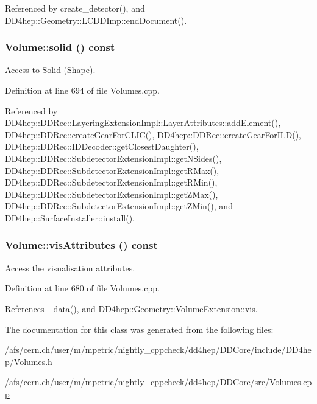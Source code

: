 Referenced by create\_\-detector(), and DD4hep::Geometry::LCDDImp::endDocument().\hypertarget{class_d_d4hep_1_1_geometry_1_1_volume_a35ba3ff621375ca5fb8e5c9474e4e179}{
\subsubsection[{solid}]{ Volume::solid () const}}
\label{class_d_d4hep_1_1_geometry_1_1_volume_a35ba3ff621375ca5fb8e5c9474e4e179}


Access to Solid (Shape). 

Definition at line 694 of file Volumes.cpp.

Referenced by DD4hep::DDRec::LayeringExtensionImpl::LayerAttributes::addElement(), DD4hep::DDRec::createGearForCLIC(), DD4hep::DDRec::createGearForILD(), DD4hep::DDRec::IDDecoder::getClosestDaughter(), DD4hep::DDRec::SubdetectorExtensionImpl::getNSides(), DD4hep::DDRec::SubdetectorExtensionImpl::getRMax(), DD4hep::DDRec::SubdetectorExtensionImpl::getRMin(), DD4hep::DDRec::SubdetectorExtensionImpl::getZMax(), DD4hep::DDRec::SubdetectorExtensionImpl::getZMin(), and DD4hep::SurfaceInstaller::install().\hypertarget{class_d_d4hep_1_1_geometry_1_1_volume_a53c50a053aebaff28bb27a36c824db50}{
\subsubsection[{visAttributes}]{ Volume::visAttributes () const}}
\label{class_d_d4hep_1_1_geometry_1_1_volume_a53c50a053aebaff28bb27a36c824db50}


Access the visualisation attributes. 

Definition at line 680 of file Volumes.cpp.

References \_\-data(), and DD4hep::Geometry::VolumeExtension::vis.

The documentation for this class was generated from the following files:\begin{DoxyCompactItemize}
\item 
/afs/cern.ch/user/m/mpetric/nightly\_\-cppcheck/dd4hep/DDCore/include/DD4hep/\hyperlink{_volumes_8h}{Volumes.h}\item 
/afs/cern.ch/user/m/mpetric/nightly\_\-cppcheck/dd4hep/DDCore/src/\hyperlink{_volumes_8cpp}{Volumes.cpp}\end{DoxyCompactItemize}
